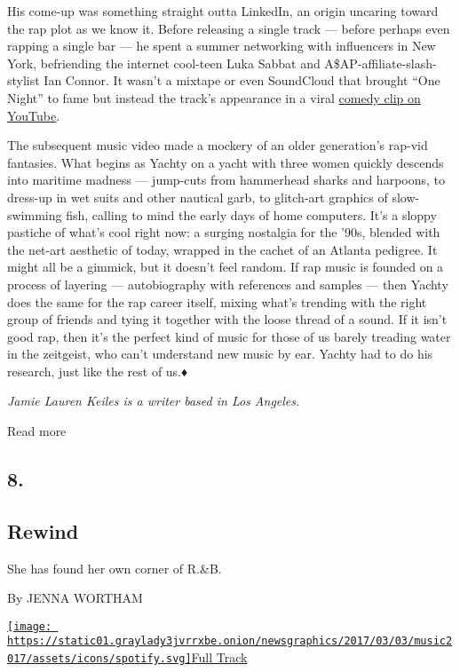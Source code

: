 His come-up was something straight outta LinkedIn, an origin uncaring
toward the rap plot as we know it. Before releasing a single track ---
before perhaps even rapping a single bar --- he spent a summer
networking with influencers in New York, befriending the internet
cool-teen Luka Sabbat and A\$AP-affiliate-slash-stylist Ian Connor. It
wasn't a mixtape or even SoundCloud that brought ``One Night'' to fame
but instead the track's appearance in a viral
\href{https://youtu.be/251cxou3yR4}{comedy clip on YouTube}.

The subsequent music video made a mockery of an older generation's
rap-vid fantasies. What begins as Yachty on a yacht with three women
quickly descends into maritime madness --- jump-cuts from hammerhead
sharks and harpoons, to dress-up in wet suits and other nautical garb,
to glitch-art graphics of slow-swimming fish, calling to mind the early
days of home computers. It's a sloppy pastiche of what's cool right now:
a surging nostalgia for the '90s, blended with the net-art aesthetic of
today, wrapped in the cachet of an Atlanta pedigree. It might all be a
gimmick, but it doesn't feel random. If rap music is founded on a
process of layering --- autobiography with references and samples ---
then Yachty does the same for the rap career itself, mixing what's
trending with the right group of friends and tying it together with the
loose thread of a sound. If it isn't good rap, then it's the perfect
kind of music for those of us barely treading water in the zeitgeist,
who can't understand new music by ear. Yachty had to do his research,
just like the rest of us.♦

\emph{Jamie Lauren Keiles is a writer based in Los Angeles.}

Read more

\hypertarget{8}{%
\subsection{8.}\label{8}}

\hypertarget{--rewind}{%
\subsection{\texorpdfstring{ Rewind}{  Rewind}}\label{--rewind}}

She has found her own corner of R.\&B.

By JENNA WORTHAM

\href{https://open.spotify.com/track/2adF8MLoBFPSh1mxXYgK9T}{\texttt{[image: https://static01.graylady3jvrrxbe.onion/newsgraphics/2017/03/03/music2017/assets/icons/spotify.svg]}Full
Track}

